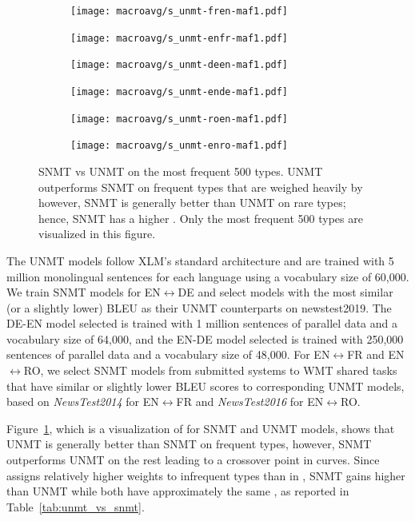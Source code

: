 \begin{figure}[ht]
    \centering
    \begin{subfigure}[b]{0.49\linewidth}
    \texttt{[image: macroavg/s\_unmt-fren-maf1.pdf]}
    \end{subfigure}
    \begin{subfigure}[b]{0.49\linewidth}
    \texttt{[image: macroavg/s\_unmt-enfr-maf1.pdf]}
    \end{subfigure}
    
    \begin{subfigure}[b]{0.49\linewidth}
    \texttt{[image: macroavg/s\_unmt-deen-maf1.pdf]}
    \end{subfigure}
    \begin{subfigure}[b]{0.49\linewidth}
    \texttt{[image: macroavg/s\_unmt-ende-maf1.pdf]}
    \end{subfigure}
    
    \begin{subfigure}[b]{0.49\linewidth}
    \texttt{[image: macroavg/s\_unmt-roen-maf1.pdf]}
    \end{subfigure}
    \begin{subfigure}[b]{0.49\linewidth}
      \texttt{[image: macroavg/s\_unmt-enro-maf1.pdf]}
    \end{subfigure}
    
\caption{SNMT vs UNMT  on the most frequent 500 types.
UNMT outperforms SNMT on frequent types that are weighed heavily by \bleu\, however, SNMT is generally better than UNMT on rare types; hence, SNMT has a higher .
Only the most frequent 500 types are visualized in this figure.
}
\label{fig:snmt_vs_unmt}
\end{figure}



The UNMT models follow XLM's standard architecture and are trained with 5 million monolingual sentences for each language using a vocabulary size of 60,000. 
We train SNMT models for EN$\leftrightarrow$DE and select models with the most similar (or a slightly lower) BLEU as their UNMT counterparts on newstest2019. The DE-EN model selected is trained with 1 million sentences of parallel data and a vocabulary size of 64,000, and the EN-DE model selected is trained with 250,000 sentences of parallel data and a vocabulary size of 48,000. For EN$\leftrightarrow$FR and EN$\leftrightarrow$RO, we select SNMT models from submitted systems to WMT shared tasks that have similar or slightly lower BLEU scores to corresponding UNMT models, based on \textit{NewsTest2014} for EN$\leftrightarrow$FR and \textit{NewsTest2016} for EN$\leftrightarrow$RO. 

Figure~\ref{fig:snmt_vs_unmt}, which is a visualization of  for SNMT and UNMT models,  shows that UNMT is generally better than SNMT on frequent types, however, SNMT outperforms UNMT on the rest leading to a crossover point in  curves. 
Since  assigns relatively higher weights to infrequent types than in \bleu{}, SNMT gains higher  than UNMT while both have approximately the same \bleu{}, as reported in Table~\ref{tab:unmt_vs_snmt}.